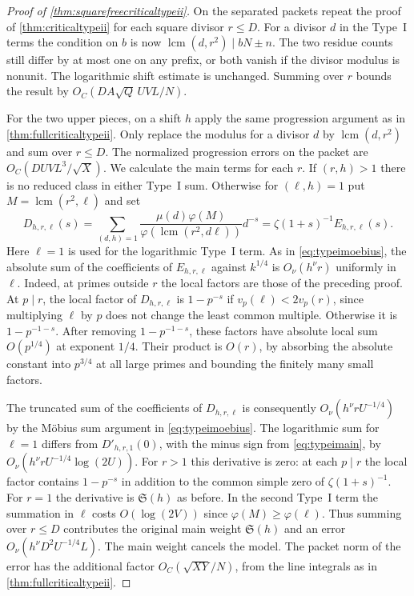 \documentclass[11pt,a4paper]{article}
\numberwithin{equation}{section}
\newcommand{\SSS}{\mathfrak S}
\begin{document}
\begin{proof}[Proof of \cref{thm:squarefreecriticaltypeii}]
On the separated packets repeat the proof of
\cref{thm:criticaltypeii} for each square divisor
$r\le D$. For a divisor $d$ in the Type~I terms the
condition on $b$ is now $\operatorname{lcm}(d,r^2)
\mid bN\pm n$. The two residue counts still differ by
at most one on any prefix, or both vanish if the
divisor modulus is nonunit. The logarithmic shift
estimate is unchanged. Summing over $r$ bounds the
result by $O_C(DA\sqrt Q\,UVL/N)$.

For the two upper pieces, on a shift $h$ apply the
same progression argument as in \cref{thm:fullcriticaltypeii}.
Only replace the modulus for a divisor $d$ by
$\operatorname{lcm}(d,r^2)$ and sum over $r\le D$.
The normalized progression errors on the packet are
$O_C(DUV L^3/\sqrt X)$.
We calculate the main terms for each $r$.
If $(r,h)>1$ there is no reduced class in either
Type~I sum. Otherwise for $(\ell,h)=1$ put
$M=\operatorname{lcm}(r^2,\ell)$ and set
\[
 D_{h,r,\ell}(s)
 =\sum_{(d,h)=1}
    \frac{\mu(d)\varphi(M)}{\varphi(\operatorname{lcm}(r^2,d\ell))}
      d^{-s}
 =\zeta(1+s)^{-1}E_{h,r,\ell}(s).
\]
Here $\ell=1$ is used for the logarithmic Type~I term.
As in \cref{eq:typeimoebius}, the absolute sum of
the coefficients of $E_{h,r,\ell}$ against $k^{1/4}$
is $O_\nu(h^\nu r)$ uniformly in $\ell$.
Indeed, at primes outside $r$ the local factors are
those of the preceding proof. At $p\mid r$, the local
factor of $D_{h,r,\ell}$ is $1-p^{-s}$ if
$v_p(\ell)<2v_p(r)$, since multiplying $\ell$ by $p$
does not change the least common multiple. Otherwise
it is $1-p^{-1-s}$. After removing $1-p^{-1-s}$,
these factors have absolute local sum $O(p^{1/4})$ at
exponent $1/4$. Their product is $O(r)$, by absorbing
the absolute constant into $p^{3/4}$ at all large
primes and bounding the finitely many small factors.

The truncated sum of the coefficients of
$D_{h,r,\ell}$ is consequently $O_\nu(h^\nu r U^{-1/4})$
by the M\"obius sum argument in \cref{eq:typeimoebius}.
The logarithmic sum for $\ell=1$ differs from
$D'_{h,r,1}(0)$, with the minus sign from
\cref{eq:typeimain}, by
$O_\nu(h^\nu r U^{-1/4}\log(2U))$.
For $r>1$ this derivative is zero: at each $p\mid r$
the local factor contains $1-p^{-s}$ in addition
to the common simple zero of $\zeta(1+s)^{-1}$.
For $r=1$ the derivative is $\SSS(h)$ as before.
In the second Type~I term the summation in $\ell$
costs $O(\log(2V))$ since $\varphi(M)\ge\varphi(\ell)$.
Thus summing over $r\le D$ contributes the original
main weight $\SSS(h)$ and an error
$O_\nu(h^\nu D^2 U^{-1/4}L)$.
The main weight cancels the model. The packet norm
of the error has the additional factor
$O_C(\sqrt{XY}/N)$, from the line integrals as in
\cref{thm:fullcriticaltypeii}.


\end{proof}
\end{document}

